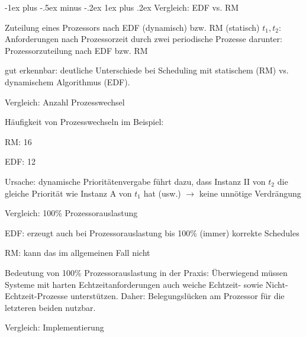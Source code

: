 \documentclass[a4paper]{article}
\makeatletter
\renewcommand{\subsubsection}{\@startsection{subsubsection}{3}{0mm}%
 {-1ex plus -.5ex minus -.2ex}%
 {1ex plus .2ex}%
 {\normalfont\small\bfseries}}
\makeatother
\begin{document}
\begin{multicols}{3}
    \subsubsection{Vergleich: EDF vs. RM}

    Zuteilung eines Prozessors nach EDF (dynamisch) bzw. RM (statisch)
    $t_1,t_2$: Anforderungen nach Prozessorzeit durch zwei periodische
    Prozesse darunter: Prozessorzuteilung nach EDF bzw. RM

    \begin{itemize*}
        \item
        gut erkennbar: deutliche Unterschiede bei Scheduling mit statischem
        (RM) vs. dynamischem Algorithmus (EDF).
    \end{itemize*}

    Vergleich: Anzahl Prozesswechsel

    \begin{itemize*}
        \item
        Häufigkeit von Prozesswechseln im Beispiel:
        \begin{itemize*}
            \item RM: 16
            \item EDF: 12
        \end{itemize*}
        \item
        Ursache: dynamische Prioritätenvergabe führt dazu, dass Instanz II von
        $t_2$ die gleiche Priorität wie Instanz A von $t_1$ hat (usw.)
        $\rightarrow$ keine unnötige Verdrängung
    \end{itemize*}

    Vergleich: 100\% Prozessorauslastung

    \begin{itemize*}
        \item
        EDF: erzeugt auch bei Prozessorauslastung bis 100\% (immer) korrekte
        Schedules
        \item
        RM: kann das im allgemeinen Fall nicht
        \item
        Bedeutung von 100\% Prozessorauslastung in der Praxis: Überwiegend
        müssen Systeme mit harten Echtzeitanforderungen auch weiche Echtzeit-
        sowie Nicht-Echtzeit-Prozesse unterstützen. Daher: Belegungslücken am
        Prozessor für die letzteren beiden nutzbar.
    \end{itemize*}

    Vergleich: Implementierung


\end{multicols}
\end{document}
